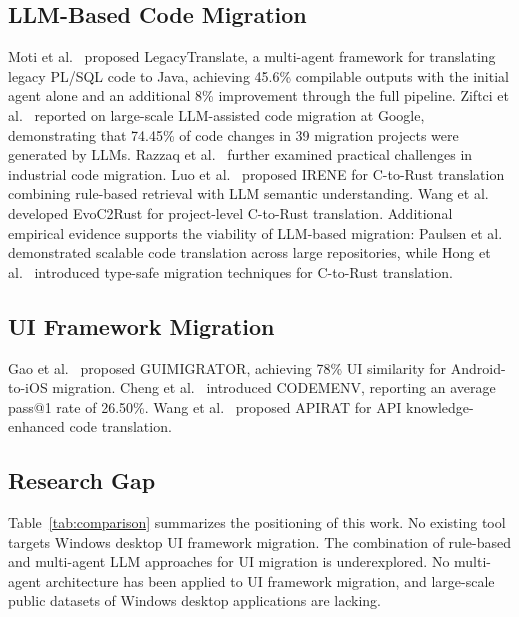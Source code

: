 \documentclass[conference]{IEEEtran}
\begin{document}
\subsection{LLM-Based Code Migration}

Moti et al.~\cite{moti2026} proposed LegacyTranslate, a multi-agent framework for translating legacy PL/SQL code to Java, achieving 45.6\% compilable outputs with the initial agent alone and an additional 8\% improvement through the full pipeline. Ziftci et al.~\cite{ziftci2025} reported on large-scale LLM-assisted code migration at Google, demonstrating that 74.45\% of code changes in 39 migration projects were generated by LLMs. Razzaq et al.~\cite{razzaq2024} further examined practical challenges in industrial code migration. Luo et al.~\cite{luo2025} proposed IRENE for C-to-Rust translation combining rule-based retrieval with LLM semantic understanding. Wang et al.~\cite{wang2026evoc2rust} developed EvoC2Rust for project-level C-to-Rust translation. Additional empirical evidence supports the viability of LLM-based migration: Paulsen et al.~\cite{paulsen2025} demonstrated scalable code translation across large repositories, while Hong et al.~\cite{hong2025} introduced type-safe migration techniques for C-to-Rust translation.

\subsection{UI Framework Migration}

Gao et al.~\cite{gao2024} proposed GUIMIGRATOR, achieving 78\% UI similarity for Android-to-iOS migration. Cheng et al.~\cite{cheng2025} introduced CODEMENV, reporting an average pass@1 rate of 26.50\%. Wang et al.~\cite{wang2025apirat} proposed APIRAT for API knowledge-enhanced code translation.

\subsection{Research Gap}

Table~\ref{tab:comparison} summarizes the positioning of this work. No existing tool targets Windows desktop UI framework migration. The combination of rule-based and multi-agent LLM approaches for UI migration is underexplored. No multi-agent architecture has been applied to UI framework migration, and large-scale public datasets of Windows desktop applications are lacking.
\end{document}
